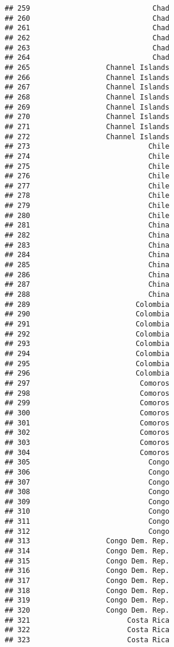 \documentclass[]{article}
\begin{document}
\begin{verbatim}
## 259                             Chad
## 260                             Chad
## 261                             Chad
## 262                             Chad
## 263                             Chad
## 264                             Chad
## 265                  Channel Islands
## 266                  Channel Islands
## 267                  Channel Islands
## 268                  Channel Islands
## 269                  Channel Islands
## 270                  Channel Islands
## 271                  Channel Islands
## 272                  Channel Islands
## 273                            Chile
## 274                            Chile
## 275                            Chile
## 276                            Chile
## 277                            Chile
## 278                            Chile
## 279                            Chile
## 280                            Chile
## 281                            China
## 282                            China
## 283                            China
## 284                            China
## 285                            China
## 286                            China
## 287                            China
## 288                            China
## 289                         Colombia
## 290                         Colombia
## 291                         Colombia
## 292                         Colombia
## 293                         Colombia
## 294                         Colombia
## 295                         Colombia
## 296                         Colombia
## 297                          Comoros
## 298                          Comoros
## 299                          Comoros
## 300                          Comoros
## 301                          Comoros
## 302                          Comoros
## 303                          Comoros
## 304                          Comoros
## 305                            Congo
## 306                            Congo
## 307                            Congo
## 308                            Congo
## 309                            Congo
## 310                            Congo
## 311                            Congo
## 312                            Congo
## 313                  Congo Dem. Rep.
## 314                  Congo Dem. Rep.
## 315                  Congo Dem. Rep.
## 316                  Congo Dem. Rep.
## 317                  Congo Dem. Rep.
## 318                  Congo Dem. Rep.
## 319                  Congo Dem. Rep.
## 320                  Congo Dem. Rep.
## 321                       Costa Rica
## 322                       Costa Rica
## 323                       Costa Rica

\end{verbatim}
\end{document}
